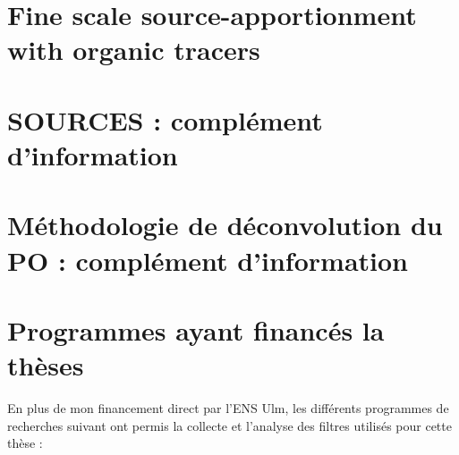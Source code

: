 \documentclass[a4paper,11pt]{book}
\begin{document}
\section{Fine scale source-apportionment with organic tracers}%
\label{annexe:borlazaSA}


\section{SOURCES : complément d'information}
\label{annexe:SOURCES_SI}


\section{Méthodologie de déconvolution du PO : complément d'information}
\label{annexe:deconvol_OP_SI}


\section{Programmes ayant financés la thèses}%
\label{annexe:programmes_ayant_financés_la_thèses}

En plus de mon financement direct par l'ENS Ulm, les différents programmes de recherches
suivant ont permis la collecte et l'analyse des filtres utilisés pour cette thèse :
\end{document}
